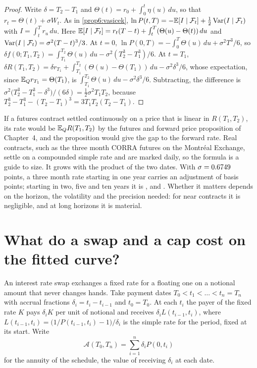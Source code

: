 \begin{chapterrefs}
\begin{proof}
Write $\delta=T_2-T_1$ and $\Theta(t)=r_0+\int_0^t\eta(u)\,du$, so that $r_t=\Theta(t)+\sigma W_t$. As in
\cref{prop6:vasicek}, $\ln P(t,T)=-\mathbb{E}[I\mid\mathcal F_t]+\tfrac12\operatorname{Var}(I\mid\mathcal F_t)$ with
$I=\int_t^Tr_u\,du$. Here $\mathbb{E}[I\mid\mathcal F_t]=r_t(T-t)+\int_t^T(\Theta(u)-\Theta(t))\,du$ and
$\operatorname{Var}(I\mid\mathcal F_t)=\sigma^2(T-t)^3/3$. At $t=0$, $\ln P(0,T)=-\int_0^T\Theta(u)\,du+\sigma^2T^3/6$, so
$\delta f(0;T_1,T_2)=\int_{T_1}^{T_2}\Theta(u)\,du-\sigma^2(T_2^3-T_1^3)/6$. At $t=T_1$,
$\delta R(T_1,T_2)=\delta r_{T_1}+\int_{T_1}^{T_2}(\Theta(u)-\Theta(T_1))\,du-\sigma^2\delta^3/6$, whose
expectation, since $\mathbb{E}_Qr_{T_1}=\Theta(T_1)$, is $\int_{T_1}^{T_2}\Theta(u)\,du-\sigma^2\delta^3/6$.
Subtracting, the difference is $\sigma^2\bigl(T_2^3-T_1^3-\delta^3\bigr)/(6\delta)=\tfrac12\sigma^2T_1T_2$,
because $T_2^3-T_1^3-(T_2-T_1)^3=3T_1T_2(T_2-T_1)$.
\end{proof}

If a futures contract settled continuously on a price that is linear in $R(T_1,T_2)$, its rate would be
$\mathbb{E}_QR(T_1,T_2)$ by the futures and forward price proposition of Chapter~4, and the proposition would give the gap to the forward rate.
Real contracts, such as the three month CORRA futures on the Montr\'eal Exchange, settle on a
compounded simple rate and are marked daily, so the formula is a guide to size. It grows with the
product of the two dates. With $\sigma=0.6749$ points, a three month rate starting in one year
carries an adjustment of \hlAdjOne{} basis points; starting in two, five and ten years it is
\hlAdjTwo, \hlAdjFive{} and \hlAdjTen. Whether it matters depends on the horizon, the volatility and the precision needed: for near
contracts it is negligible, and at long horizons it is material.


\section{What do a swap and a cap cost on the fitted curve?}
\label{sec6:swaps}

An interest rate swap exchanges a fixed rate for a floating one on a notional amount that never
changes hands. Take payment dates $T_0<t_1<\dots<t_n=T_n$ with accrual fractions
$\delta_i=t_i-t_{i-1}$ and $t_0=T_0$. At each $t_i$ the payer of the fixed rate $K$ pays $\delta_iK$
per unit of notional and receives $\delta_iL(t_{i-1},t_i)$, where $L(t_{i-1},t_i)=\bigl(1/P(t_{i-1},t_i)-1\bigr)/\delta_i$ is the
simple rate for the period, fixed at its start. Write
\[
  \mathcal A(T_0,T_n)=\sum_{i=1}^n\delta_iP(0,t_i)
\]
for the annuity of the schedule, the value of receiving $\delta_i$ at each date.


\end{chapterrefs}
